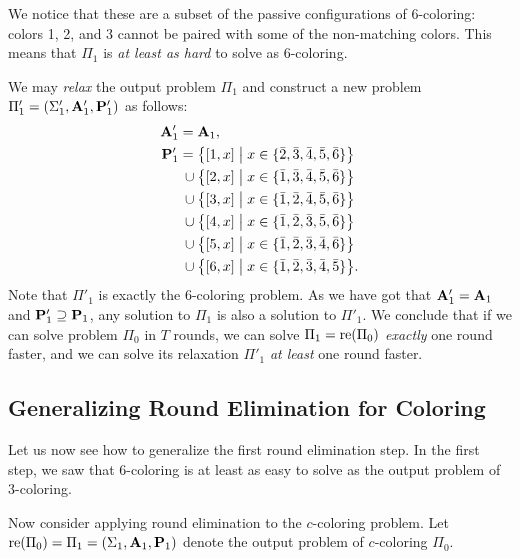 We notice that these are a subset of the passive configurations of 6-coloring: colors 1, 2, and 3 cannot be paired with some of the non-matching colors. This means that $\Pi_1$ is \emph{at least as hard} to solve as 6-coloring.

We may \emph{relax} the output problem $\Pi_1$ and construct a new problem $\Pi'_1 = (\Sigma'_1, \mathbf{A}'_1, \mathbf{P}'_1)$ as follows:
\begingroup
\allowdisplaybreaks
\begin{align*}
 \mathbf{A}'_1 = {}&\mathbf{A}_1,\\
 \mathbf{P}'_1
       = {}&\bigl\{ [1, x] \bigm| x \in \{ \bar{2}, \bar{3}, \bar{4}, \bar{5}, \bar{6} \} \bigr\} \\
 {} \cup {}&\bigl\{ [2, x] \bigm| x \in \{ \bar{1}, \bar{3}, \bar{4}, \bar{5}, \bar{6} \} \bigr\} \\
 {} \cup {}&\bigl\{ [3, x] \bigm| x \in \{ \bar{1}, \bar{2}, \bar{4}, \bar{5}, \bar{6} \} \bigr\} \\
 {} \cup {}&\bigl\{ [4, x] \bigm| x \in \{ \bar{1}, \bar{2}, \bar{3}, \bar{5}, \bar{6} \} \bigr\} \\
 {} \cup {}&\bigl\{ [5, x] \bigm| x \in \{ \bar{1}, \bar{2}, \bar{3}, \bar{4}, \bar{6} \} \bigr\} \\
 {} \cup {}&\bigl\{ [6, x] \bigm| x \in \{ \bar{1}, \bar{2}, \bar{3}, \bar{4}, \bar{5} \} \bigr\}.
\end{align*}
\endgroup
Note that $\Pi'_1$ is exactly the $6$-coloring problem. As we have got that $\mathbf{A}'_1 = \mathbf{A}_1$ and $\mathbf{P}'_1 \supseteq \mathbf{P}_1$, any solution to $\Pi_1$ is also a solution to $\Pi'_1$. We conclude that if we can solve problem $\Pi_0$ in $T$ rounds, we can solve $\Pi_1 = \operatorname{re}(\Pi_0)$ \emph{exactly} one round faster, and we can solve its relaxation $\Pi'_1$ \emph{at least} one round faster.

\subsection{Generalizing Round Elimination for Coloring}

Let us now see how to generalize the first round elimination step. In the first step, we saw that 6-coloring is at least as easy to solve as the output problem of 3-coloring.

Now consider applying round elimination to the $c$-coloring problem. Let $\operatorname{re}(\Pi_0) = \Pi_1 = (\Sigma_1,\mathbf{A}_1, \mathbf{P}_1)$ denote the output problem of $c$-coloring $\Pi_0$.

